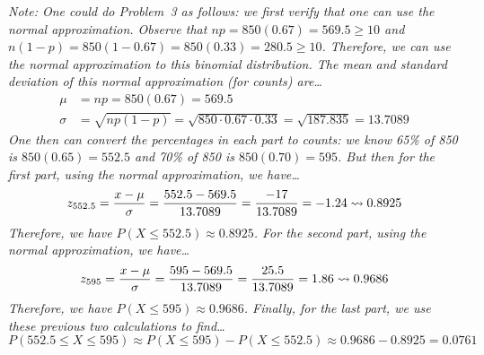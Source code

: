 \documentclass[11pt,letterpaper]{article}
\begin{document}
{\itshape
Note: One could do Problem~3 as follows: we first verify that one can use the normal approximation. Observe that $np= 850(0.67)= 569.5 \geq 10$ and $n(1 - p)= 850(1 - 0.67)= 850(0.33)= 280.5 \geq 10$. Therefore, we can use the normal approximation to this binomial distribution. The mean and standard deviation of this normal approximation (for counts) are\dots
	\[
	\begin{aligned}
	\mu&= np= 850(0.67)= 569.5 \\[0.3cm]
	\sigma&= \sqrt{np(1 - p)}= \sqrt{850 \cdot 0.67 \cdot 0.33}= \sqrt{187.835}= 13.7089
	\end{aligned}
	\] \pspace
One then can convert the percentages in each part to counts: we know 65\% of 850 is 
$850(0.65)= 552.5$ and 70\% of 850 is $850(0.70)= 595$. But then for the first part, using the normal approximation, we have\dots
	\[
	z_{552.5}= \dfrac{x - \mu}{\sigma}= \dfrac{552.5 - 569.5}{13.7089}= \dfrac{-17}{13.7089}= -1.24 \rightsquigarrow 0.8925
	\]
Therefore, we have $P(X \leq 552.5) \approx 0.8925$. For the second part, using the normal approximation, we have\dots
	\[
	z_{595}= \dfrac{x - \mu}{\sigma}= \dfrac{595 - 569.5}{13.7089}= \dfrac{25.5}{13.7089}= 1.86 \rightsquigarrow 0.9686
	\]
Therefore, we have $P(X \leq 595) \approx 0.9686$. Finally, for the last part, we use these previous two calculations to find\dots
	\[
	P(552.5 \leq X \leq 595) \approx P(X \leq 595) - P(X \leq 552.5) \approx 0.9686 - 0.8925= 0.0761
	\]
}
\end{document}

